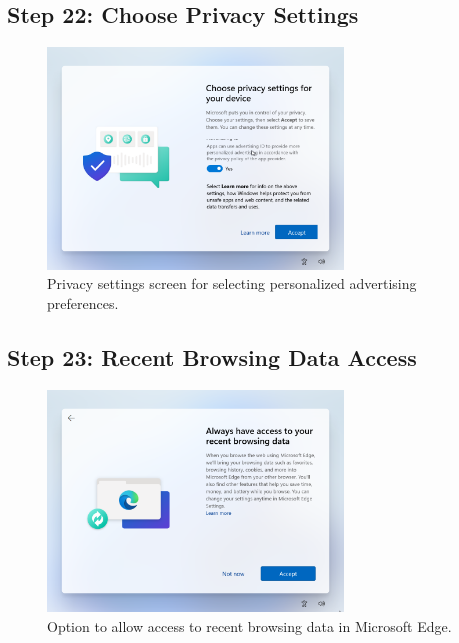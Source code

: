 \documentclass{article}
\begin{document}
\subsection{Step 22: Choose Privacy Settings}
\begin{figure}[H]
    \centering
    \includegraphics[width=0.7\textwidth]{2024-09-17_15-29-51.png}
    \caption{Privacy settings screen for selecting personalized advertising preferences.}
    \label{fig:privacy_settings}
\end{figure}

\subsection{Step 23: Recent Browsing Data Access}
\begin{figure}[H]
    \centering
    \includegraphics[width=0.7\textwidth]{2024-09-17_15-30-52.png}
    \caption{Option to allow access to recent browsing data in Microsoft Edge.}
    \label{fig:browsing_data}
\end{figure}
\end{document}
